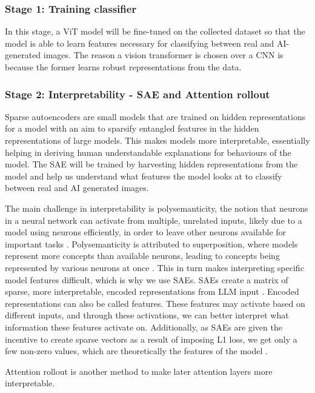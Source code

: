 \documentclass[10pt,twocolumn,letterpaper]{article}
\begin{document}
\subsubsection{Stage 1: Training classifier}
In this stage, a ViT model \cite{dosovitskiyImageWorth16x162021} will be fine-tuned on the collected dataset so that the model is able to learn features necessary for classifying between real and AI-generated images. The reason a vision transformer is chosen over a CNN is because the former learns robust representations from the data.

\subsubsection{Stage 2: Interpretability - SAE and Attention rollout}
Sparse autoencoders are small models that are trained on hidden representations for a model with an aim to sparsify entangled features in the hidden representations of large models. This makes models more interpretable, essentially helping in deriving human understandable explanations for behaviours of the model. The SAE will be trained by harvesting hidden representations from the model and help us understand what features the model looks at to classify between real and AI generated images.

The main challenge in interpretability is polysemanticity, the notion that neurons in a neural network can activate from multiple, unrelated inputs, likely due to a model using neurons efficiently, in order to leave other neurons available for important tasks \cite{olah2020zoom}. Polysemanticity is attributed to superposition, where models represent more concepts than available neurons, leading to concepts being represented by various neurons at once  \cite{karvonen_intuitive_2024}.  This in turn makes interpreting specific model features difficult, which is why we use SAEs. SAEs create a matrix of sparse, more interpretable, encoded representations from LLM input  \cite{karvonen_intuitive_2024}. Encoded representations can also be called features. These features may activate based on different inputs, and through these activations, we can better interpret what information these features activate on. Additionally, as SAEs are given the incentive to create sparse vectors as a result of imposing L1 loss, we get only a few non-zero values, which are theoretically the  features of the model \cite{kutsyk_sparse_2024}. 

Attention rollout \cite{abnarQuantifyingAttentionFlow2020} is another method to make later attention layers more interpretable.
\end{document}
